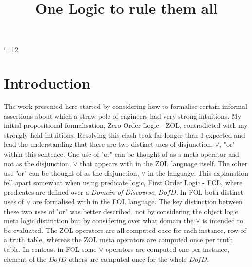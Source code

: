 \def\cdstrut{\vrule height .6\cdsep width 0pt depth .4\cdsep}
\def\@cdstrut{{\advance\cdsep by 2em\cdstrut}}

\def\arrow#1#2{
  \ifx d#1
    \llap{$\scriptstyle#2$}\left\downarrow\cdstrut\right.\@cdstrut\fi
  \ifx u#1
    \llap{$\scriptstyle#2$}\left\uparrow\cdstrut\right.\@cdstrut\fi
  \ifx r#1
    \mathop{\hbox to \cdsep{\rightarrowfill}}\limits^{#2}\fi
  \ifx l#1
    \mathop{\hbox to \cdsep{\leftarrowfill}}\limits^{#2}\fi
}
\catcode`\@=12

\pagestyle{plain}

\title{One Logic to rule them all}
\author{}




\maketitle
\thispagestyle{empty}

\vspace{-.5cm}
\begin{abstract}   
 


\end{abstract}



\section{Introduction}\label{sec:ex}
The work presented here started by considering how to formalise certain  informal assertions about which a straw pole of engineers had very strong intuitions. My  initial propositional formalisation, Zero Order Logic - ZOL, contradicted with my strongly held intuitions. Resolving this clash took far longer than I expected and lead the understanding that there are two distinct uses of disjunction, $\vee$, "or" within this sentence. One use of "or"  can be thought of as a meta operator and  not as the disjunction, $\vee$ that appears with in the ZOL language itself.  The other use  "or" can be thought of as the disjunction, $\vee$ in the language. This explanation fell apart somewhat when using predicate logic, First Order Logic - FOL, where predicates are defined over a \emph{Domain of Discourse}, $DofD$. In FOL both distinct uses of $\vee$ are formalised with in the FOL language. The key distinction between these two uses of "or" was better described, not by considering the object logic meta logic distinction but by considering over what domain the $\vee$ is intended to be evaluated. The ZOL operators are all  computed once for each instance, row of a truth table, whereas the ZOL meta operators are computed once per truth table. In contrast in FOL some $\vee$ operators are computed one per instance, element of the $DofD$ others are computed once for the whole $DofD$.



